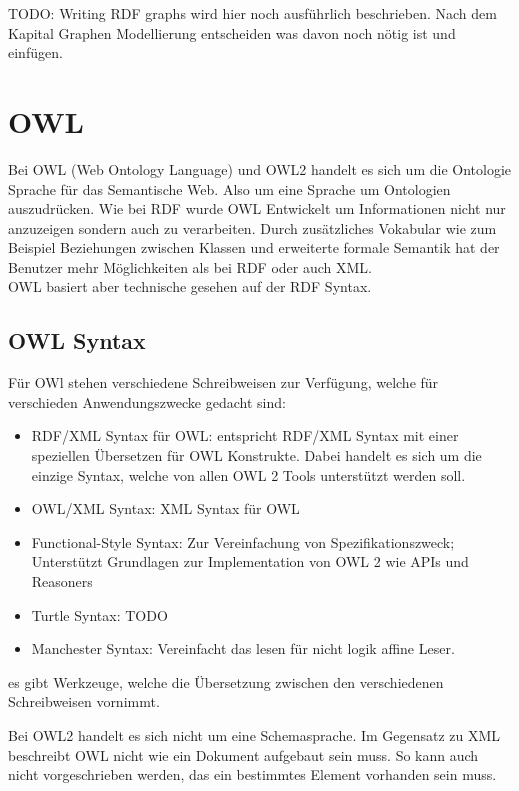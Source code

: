 TODO: Writing RDF graphs wird hier noch ausführlich beschrieben. Nach dem Kapital Graphen Modellierung entscheiden was davon noch nötig ist und einfügen.

\section{OWL}
\label{sec:owlRdf_owl}

Bei OWL (Web Ontology Language) und OWL2 handelt es sich um die Ontologie Sprache für das Semantische Web.\cite{cambSemOWL} Also um eine Sprache um Ontologien auszudrücken. Wie bei RDF wurde OWL Entwickelt um Informationen nicht nur anzuzeigen sondern auch zu verarbeiten. Durch zusätzliches Vokabular wie zum Beispiel Beziehungen zwischen Klassen und erweiterte formale Semantik hat der Benutzer mehr Möglichkeiten als bei RDF oder auch XML. \\OWL basiert aber technische gesehen auf der RDF Syntax. %

\subsection{OWL Syntax}
\label{subsec:owlRdf_owl_syntax}
Für OWl stehen verschiedene Schreibweisen zur Verfügung, welche für verschieden Anwendungszwecke gedacht sind:
\begin{itemize}
	\item RDF/XML Syntax für OWL: entspricht RDF/XML Syntax mit einer speziellen Übersetzen für OWL Konstrukte. Dabei handelt es sich um die einzige Syntax, welche von allen OWL 2 Tools unterstützt werden soll.
	\item OWL/XML Syntax: XML Syntax für OWL
	\item Functional-Style Syntax: Zur Vereinfachung von Spezifikationszweck; Unterstützt Grundlagen zur Implementation von OWL 2 wie APIs und Reasoners
	\item Turtle Syntax: TODO 
	\item Manchester Syntax: Vereinfacht das lesen für nicht logik affine Leser.
\end{itemize}
es gibt Werkzeuge, welche die Übersetzung zwischen den verschiedenen Schreibweisen vornimmt.

Bei OWL2 handelt es sich nicht um eine Schemasprache. Im Gegensatz zu XML beschreibt OWL nicht wie ein Dokument aufgebaut sein muss. So kann auch nicht vorgeschrieben werden, das ein bestimmtes Element vorhanden sein muss.


